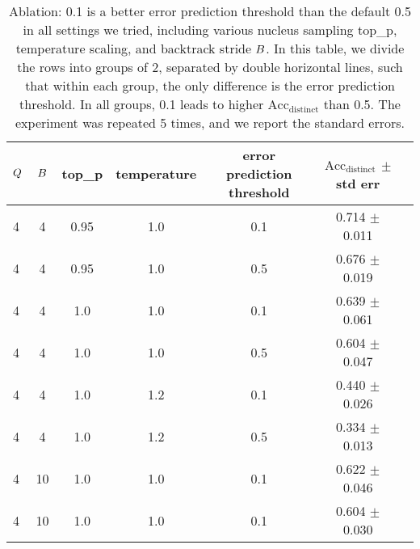 \begin{table*}[t]
\begin{center}
\begin{small}
\begin{tabular}{ lcccccc }
\toprule
\textbf{$Q$} & \textbf{$B$} & \textbf{top\_p} & \textbf{temperature} & \textbf{error prediction threshold} & \textbf{$\text{Acc}_\text{distinct}$ $\pm$ std err} \\
\hline
\hline
4 & 4 & 0.95 & 1.0 & 0.1 &  0.714 $\pm$ 0.011 \\
\hline
4 & 4 & 0.95 & 1.0 & 0.5 &  0.676 $\pm$ 0.019 \\
\hline
\hline
4 & 4 & 1.0 & 1.0 & 0.1 &  0.639 $\pm$ 0.061 \\
\hline
4 & 4 & 1.0 & 1.0 & 0.5 &  0.604 $\pm$ 0.047 \\
\hline
\hline
4 & 4 & 1.0 & 1.2 & 0.1 &  0.440 $\pm$ 0.026 \\
\hline
4 & 4 & 1.0 & 1.2 & 0.5 &  0.334 $\pm$ 0.013 \\
\hline
\hline
4 & 10 & 1.0 & 1.0 & 0.1 &  0.622 $\pm$ 0.046 \\
\hline
4 & 10 & 1.0 & 1.0 & 0.1 &  0.604 $\pm$ 0.030 \\
\bottomrule
\end{tabular}
\end{small}
\end{center}
\caption{
Ablation: 0.1 is a better error prediction threshold than the default 0.5 in all settings we tried,
including various
nucleus sampling \citep{holtzman2020the} top\_p,
temperature scaling,
and backtrack stride $B$.
In this table, we divide the rows into groups of 2,
separated by double horizontal lines,
such that within each group,
the only difference is the error prediction threshold.
In all groups, 
0.1 leads to higher $\text{Acc}_\text{distinct}$ than 0.5.
The experiment was repeated 5 times,
and we report the standard errors.
}
\label{table:codellama_error_prediction_threshold}
\end{table*}





